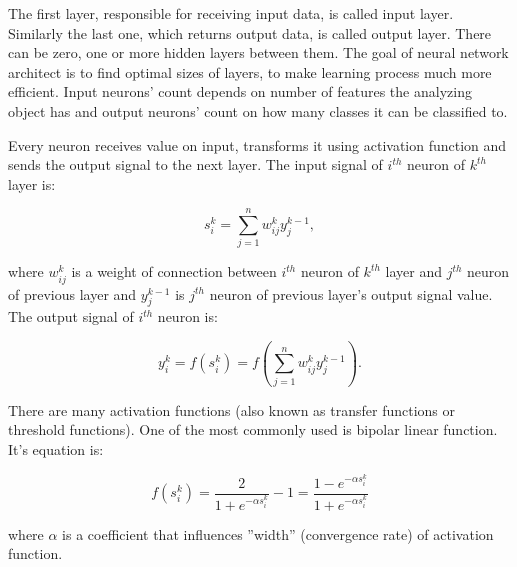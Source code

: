 \documentclass[conference]{IEEEtran}
\begin{document}
	The first layer, responsible for receiving input data, is called input layer. Similarly the last one, which returns output data, is called output layer. There can be zero, one or more hidden layers between them. The goal of neural network architect is to find optimal sizes of layers, to make learning process much more efficient. Input neurons' count depends on number of features the analyzing object has and output neurons' count on how many classes it can be classified to.
	
	Every neuron receives value on input, transforms it using activation function and sends the output signal to the next layer. The input signal of $i^{th}$ neuron of $k^{th}$ layer is:
	
	\begin{equation*}
	    s^k_i = \sum_{j=1}^{n}w^k_{ij} y^{k-1}_{j},
	\end{equation*}
	
	\noindent where $w^k_{ij}$ is a weight of connection between $i^{th}$ neuron of $k^{th}$ layer and $j^{th}$ neuron of previous layer and $y^{k-1}_{j}$ is $j^{th}$ neuron of previous layer's output signal value. The output signal of $i^{th}$ neuron is:
	
	\begin{equation*}
	    y^k_i = f(s^k_i) = f(\sum_{j=1}^{n}w^k_{ij} y^{k-1}_{j}).
	\end{equation*}
	
	\vspace{5pt}
	There are many activation functions (also known as transfer functions or threshold functions). One of the most commonly used is bipolar linear function. It's equation is:
	
	\begin{equation*}
	    f(s^k_i) = \frac{2}{1 + e^{-\alpha s^k_i}} - 1 = \frac{1 - e^{-\alpha s^k_i}}{1 + e^{-\alpha s^k_i}}
	\end{equation*}

	\vspace{5pt}
	\noindent where $\alpha$ is a coefficient that influences ''width'' (convergence rate) of activation function.  
	
\end{document}
